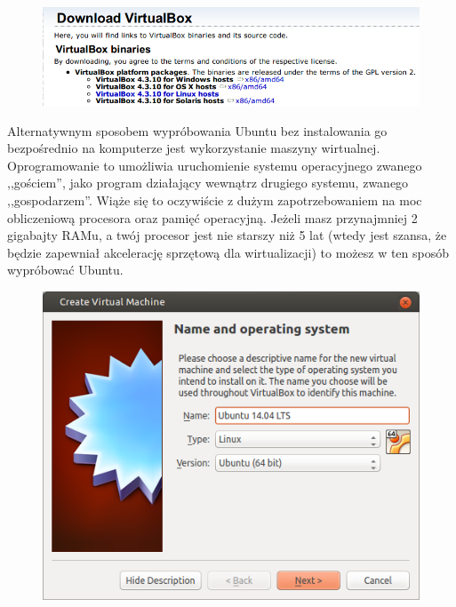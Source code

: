 \begin{figure}
	\vspace{-10pt}
	\includegraphics[width=\linewidth]{images/virtualbox_download.png}
\end{figure}

Alternatywnym sposobem wypróbowania Ubuntu bez instalowania go bezpośrednio na komputerze jest wykorzystanie maszyny wirtualnej. Oprogramowanie to umożliwia uruchomienie systemu operacyjnego zwanego ,,gościem'', jako program działający wewnątrz drugiego systemu, zwanego ,,gospodarzem''. Wiąże się to oczywiście z dużym zapotrzebowaniem na moc obliczeniową procesora oraz pamięć operacyjną. Jeżeli masz przynajmniej 2 gigabajty RAMu, a twój procesor jest nie starszy niż 5 lat (wtedy jest szansa, że będzie zapewniał akcelerację sprzętową dla wirtualizacji) to możesz w ten sposób wypróbować Ubuntu.

\begin{figure}
	\vspace{-10pt}
	\includegraphics[width=\linewidth]{images/virtualbox_wizard1.png}
\end{figure}

